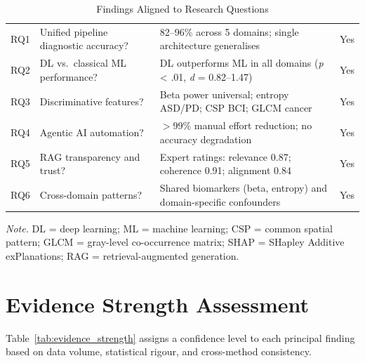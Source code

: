 \begin{table}[H]
\footnotesize
\tablestripes
\begin{tabularx}{\textwidth}{p{0.6cm} L L C}
\toprule
{} &  &  &  \\
\midrule
RQ1 & Unified pipeline diagnostic accuracy? & 82--96\% across 5 domains; single architecture generalises & Yes \\
\addlinespace
RQ2 & DL vs.\ classical ML performance? & DL outperforms ML in all domains (\textit{p} < .01, \textit{d} = 0.82--1.47) & Yes \\
\addlinespace
RQ3 & Discriminative features? & Beta power universal; entropy ASD/PD; CSP BCI; GLCM cancer & Yes \\
\addlinespace
RQ4 & Agentic AI automation? & $>$99\% manual effort reduction; no accuracy degradation & Yes \\
\addlinespace
RQ5 & RAG transparency and trust? & Expert ratings: relevance 0.87; coherence 0.91; alignment 0.84 & Yes \\
\addlinespace
RQ6 & Cross-domain patterns? & Shared biomarkers (beta, entropy) and domain-specific confounders & Yes \\
\bottomrule
\end{tabularx}
\caption{Findings Aligned to Research Questions}
\label{tab:findings_rq_alignment}
\vspace{0.5em}\noindent\textit{Note.} DL = deep learning; ML = machine learning; CSP = common spatial pattern; GLCM = gray-level co-occurrence matrix; SHAP = SHapley Additive exPlanations; RAG = retrieval-augmented generation.
\end{table}


\section{Evidence Strength Assessment}
\label{sec:evidence_assessment}

Table~\ref{tab:evidence_strength} assigns a confidence level to each principal finding based on data volume, statistical rigour, and cross-method consistency.

